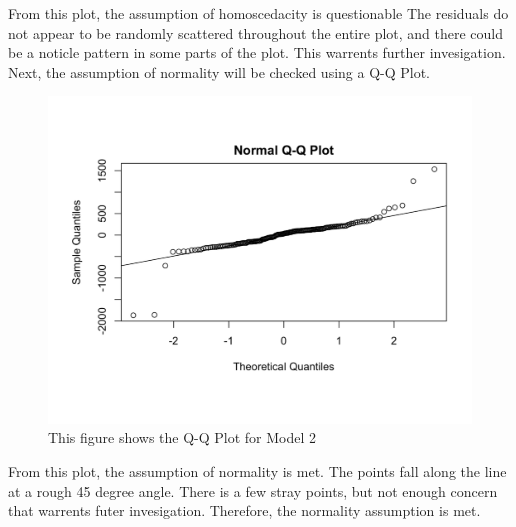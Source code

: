 \documentclass[12pt]{article}
\begin{document}
From this plot, the assumption of homoscedacity is questionable
The residuals do not appear to be randomly scattered throughout the entire plot, and there could be a noticle pattern in some parts of the plot. 
This warrents further invesigation. 
Next, the assumption of normality will be checked using a Q-Q Plot. 
\begin{figure}[H]
  \centering
  \includegraphics[scale = .35]{norm2}
  \caption{This figure shows the Q-Q Plot for Model 2}
\end{figure}
From this plot, the assumption of normality is met. 
The points fall along the line at a rough 45 degree angle. 
There is a few stray points, but not enough concern that warrents futer invesigation.
Therefore, the normality assumption is met. 
\end{document}
